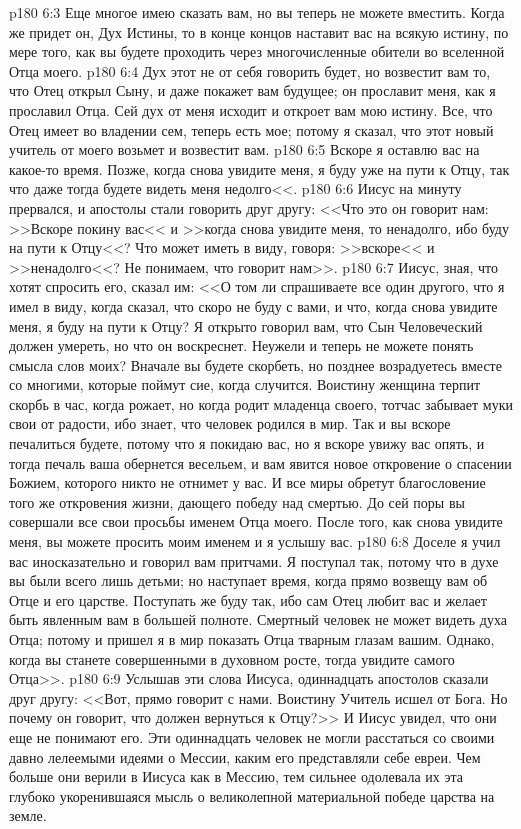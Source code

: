 \vs p180 6:3 Еще многое имею сказать вам, но вы теперь не можете вместить. Когда же придет он, Дух Истины, то в конце концов наставит вас на всякую истину, по мере того, как вы будете проходить через многочисленные обители во вселенной Отца моего.
\vs p180 6:4 Дух этот не от себя говорить будет, но возвестит вам то, что Отец открыл Сыну, и даже покажет вам будущее; он прославит меня, как я прославил Отца. Сей дух от меня исходит и откроет вам мою истину. Все, что Отец имеет во владении сем, теперь есть мое; потому я сказал, что этот новый учитель от моего возьмет и возвестит вам.
\vs p180 6:5 Вскоре я оставлю вас на какое\hyp{}то время. Позже, когда снова увидите меня, я буду уже на пути к Отцу, так что даже тогда будете видеть меня недолго<<.
\vs p180 6:6 Иисус на минуту прервался, и апостолы стали говорить друг другу: <<Что это он говорит нам: >>Вскоре покину вас<< и >>когда снова увидите меня, то ненадолго, ибо буду на пути к Отцу<<? Что может иметь в виду, говоря: >>вскоре<< и >>ненадолго<<? Не понимаем, что говорит нам>>.
\vs p180 6:7 Иисус, зная, что хотят спросить его, сказал им: <<О том ли спрашиваете все один другого, что я имел в виду, когда сказал, что скоро не буду с вами, и что, когда снова увидите меня, я буду на пути к Отцу? Я открыто говорил вам, что Сын Человеческий должен умереть, но что он воскреснет. Неужели и теперь не можете понять смысла слов моих? Вначале вы будете скорбеть, но позднее возрадуетесь вместе со многими, которые поймут сие, когда случится. Воистину женщина терпит скорбь в час, когда рожает, но когда родит младенца своего, тотчас забывает муки свои от радости, ибо знает, что человек родился в мир. Так и вы вскоре печалиться будете, потому что я покидаю вас, но я вскоре увижу вас опять, и тогда печаль ваша обернется весельем, и вам явится новое откровение о спасении Божием, которого никто не отнимет у вас. И все миры обретут благословение того же откровения жизни, дающего победу над смертью. До сей поры вы совершали все свои просьбы именем Отца моего. После того, как снова увидите меня, вы можете просить моим именем и я услышу вас.
\vs p180 6:8 Доселе я учил вас иносказательно и говорил вам притчами. Я поступал так, потому что в духе вы были всего лишь детьми; но наступает время, когда прямо возвещу вам об Отце и его царстве. Поступать же буду так, ибо сам Отец любит вас и желает быть явленным вам в большей полноте. Смертный человек не может видеть духа Отца; потому и пришел я в мир показать Отца тварным глазам вашим. Однако, когда вы станете совершенными в духовном росте, тогда увидите самого Отца>>.
\vs p180 6:9 Услышав эти слова Иисуса, одиннадцать апостолов сказали друг другу: <<Вот, прямо говорит с нами. Воистину Учитель исшел от Бога. Но почему он говорит, что должен вернуться к Отцу?>> И Иисус увидел, что они еще не понимают его. Эти одиннадцать человек не могли расстаться со своими давно лелеемыми идеями о Мессии, каким его представляли себе евреи. Чем больше они верили в Иисуса как в Мессию, тем сильнее одолевала их эта глубоко укоренившаяся мысль о великолепной материальной победе царства на земле.
